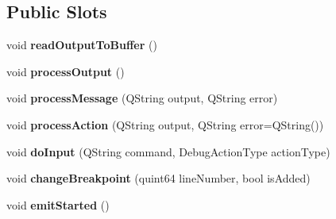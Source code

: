 \subsection*{Public Slots}
\begin{DoxyCompactItemize}
\item 
\hypertarget{class_debugger_ac89ff4b6cda77d27cf45eaec8d06eb84}{}void {\bfseries read\+Output\+To\+Buffer} ()\label{class_debugger_ac89ff4b6cda77d27cf45eaec8d06eb84}

\item 
\hypertarget{class_debugger_ae0be5fc23e7513a9b943b02b8464655c}{}void {\bfseries process\+Output} ()\label{class_debugger_ae0be5fc23e7513a9b943b02b8464655c}

\item 
\hypertarget{class_debugger_af4417fa18d936f6f9275c85e9ded4705}{}void {\bfseries process\+Message} (Q\+String output, Q\+String error)\label{class_debugger_af4417fa18d936f6f9275c85e9ded4705}

\item 
\hypertarget{class_debugger_ae53701dbcf8dbc4378b0fc3769a988f0}{}void {\bfseries process\+Action} (Q\+String output, Q\+String error=Q\+String())\label{class_debugger_ae53701dbcf8dbc4378b0fc3769a988f0}

\item 
\hypertarget{class_debugger_a6f3eae0ace3af6bf40be6cd69ca98f22}{}void {\bfseries do\+Input} (Q\+String command, Debug\+Action\+Type action\+Type)\label{class_debugger_a6f3eae0ace3af6bf40be6cd69ca98f22}

\item 
\hypertarget{class_debugger_ac18e41fff794085b939abb643d5547ae}{}void {\bfseries change\+Breakpoint} (quint64 line\+Number, bool is\+Added)\label{class_debugger_ac18e41fff794085b939abb643d5547ae}

\item 
\hypertarget{class_debugger_a83af2b195bc1dd89cb05121585ba97bf}{}void {\bfseries emit\+Started} ()\label{class_debugger_a83af2b195bc1dd89cb05121585ba97bf}

\end{DoxyCompactItemize}
